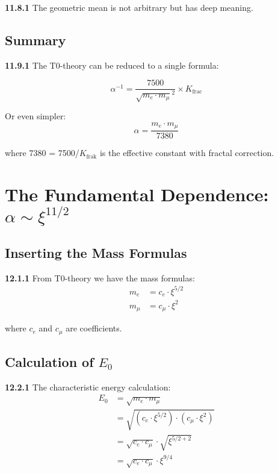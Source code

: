 \documentclass[12pt,a4paper]{article}
\newcommand{\kfrac}{K_{\text{frak}}}
\begin{document}
\noindent \textbf{11.8.1} The geometric mean is not arbitrary but has deep meaning.

\subsection{Summary}

\begin{tcolorbox}[colback=blue!5!white,colframe=blue!75!black,title=\textbf{The Essence}]
	\noindent \textbf{11.9.1} The T0-theory can be reduced to a single formula:
	
	\begin{equation}
		\boxed{\alpha^{-1} = \frac{7500}{\sqrt{m_e \cdot m_\mu}^2} \times K_{\text{frac}}}
	\end{equation}
	
	Or even simpler:
	\begin{equation}
		\boxed{\alpha = \frac{m_e \cdot m_\mu}{7380}}
	\end{equation}
	
	where 7380 = 7500/$\kfrac$ is the effective constant with fractal correction.
\end{tcolorbox}
\section{The Fundamental Dependence: $\alpha \sim \xi^{11/2}$}

\subsection{Inserting the Mass Formulas}

\noindent \textbf{12.1.1} From T0-theory we have the mass formulas:
\begin{align}
	m_e &= c_e \cdot \xi^{5/2} \\
	m_\mu &= c_\mu \cdot \xi^2
\end{align}

where $c_e$ and $c_\mu$ are coefficients.

\subsection{Calculation of $E_0$}

\noindent \textbf{12.2.1} The characteristic energy calculation:
\begin{align}
	E_0 &= \sqrt{m_e \cdot m_\mu} \\
	&= \sqrt{(c_e \cdot \xi^{5/2}) \cdot (c_\mu \cdot \xi^2)} \\
	&= \sqrt{c_e \cdot c_\mu} \cdot \sqrt{\xi^{5/2 + 2}} \\
	&= \sqrt{c_e \cdot c_\mu} \cdot \xi^{9/4}
\end{align}
\end{document}
